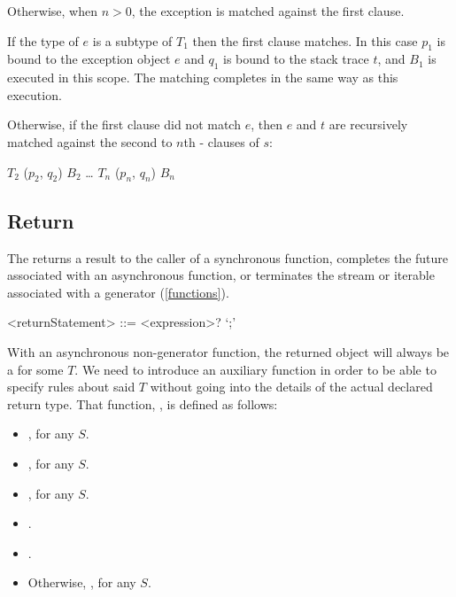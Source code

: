 \documentclass[makeidx]{article}
\begin{document}
\LMHash{}%
Otherwise, when $n > 0$,
the exception is matched against the first clause.

\LMHash{}%
If the type of $e$ is a subtype of $T_1$ then the first clause matches.
In this case $p_1$ is bound to the exception object $e$
and $q_1$ is bound to the stack trace $t$,
and $B_1$ is executed in this scope.
The matching completes in the same way as this execution.

\LMHash{}%
Otherwise, if the first clause did not match $e$,
then $e$ and $t$ are recursively matched against
the second to $n$th \ON-\CATCH{} clauses of $s$:

\begin{normativeDartCode}
\ON{} $T_2$ \CATCH{} ($p_2$, $q_2$) $B_2$
\ldots
\ON{} $T_n$ \CATCH{} ($p_n$, $q_n$) $B_n$
\end{normativeDartCode}


\subsection{Return}

\LMHash{}%
The 
returns a result to the caller of a synchronous function,
completes the future associated with an asynchronous function,
or terminates the stream or iterable associated with a generator
(\ref{functions}).

\begin{grammar}
<returnStatement> ::= \RETURN{} <expression>? `;'
\end{grammar}

\LMHash{}%
With an asynchronous non-generator function,
the returned object will always be a  for some $T$.
We need to introduce an auxiliary function
in order to be able to specify rules about said $T$
without going into the details of the actual declared return type.
That function, \FutureValueTypeOfName, is defined as follows:

\begin{itemize}
\item {},
  for any $S$.
\item {}, for any $S$.
\item {}, for any $S$.
\item \DefEquals{\FutureValueTypeOf{\VOID}}{\VOID}.
\item \DefEquals{\FutureValueTypeOf{\DYNAMIC}}{\DYNAMIC}.
\item Otherwise, ,
  for any $S$.
\end{itemize}
\end{document}
